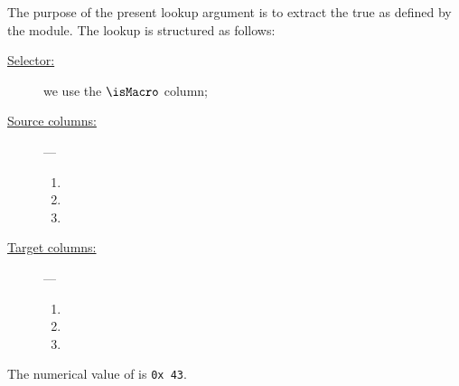 The purpose of the present lookup argument is to extract the true  as defined by the \btcMod{} module.
The lookup is structured as follows:
\begin{description}
	\item[\underline{Selector:}] we use the $\isMacro$ column;
	\item[\underline{Source columns:}] ---
		\begin{multicols}{3}
			\begin{enumerate}
				\item \relBlock{}
				\item \absBlock{}
				\item {}
			\end{enumerate}
		\end{multicols}
	\item[\underline{Target columns:}] ---
		\begin{multicols}{3}
			\begin{enumerate}
				\item \relBlock{}
				\item \blockDataLo{}
				\item \INST{}
			\end{enumerate}
		\end{multicols}
\end{description}
\saNote{}
The numerical value of  is \texttt{0x\,43}.
